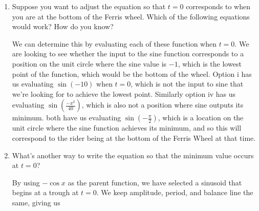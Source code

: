 \documentclass[main]{subfiles}
\begin{document}
\begin{enumerate}[resume]
\begin{enumerate}
\item 
\begin{problem}
    Suppose you want to adjust the equation so that $t=0$ corresponds to when you are at the bottom of the Ferris wheel. Which of the following equations would work? How do you know?

\end{problem}

\begin{solution}
    We can determine this by evaluating each of these function when $t=0$. We are looking to see whether the input to the sine function corresponds to a position on the unit circle where the sine value is $-1$, which is the lowest point of the function, which would be the bottom of the wheel. Option i has us evaluating $\sin(-10)$ when $t=0$, which is not the input to sine that we're looking for to achieve the lowest point. Similarly option iv has us evaluating $\sin(\frac{-\pi^2}{40})$, which is also not a position where sine outputs its minimum.  both have us evaluating $\sin(-\frac{\pi}{2})$, which is a location on the unit circle where the sine function achieves its minimum, and so this will correspond to the rider being at the bottom of the Ferris Wheel at that time.
\end{solution}
\item 
\begin{problem}
    What's another way to write the equation so that the minimum value occurs at $t=0$?
\end{problem}
\pspace{\vfill}

\begin{solution} 
By using $-\cos x$ as the parent function, we have selected a sinusoid that begins at a trough at $t=0$. We keep amplitude, period, and balance line the same, giving us 


\end{solution}
\end{enumerate}
\end{enumerate}
\end{document}
